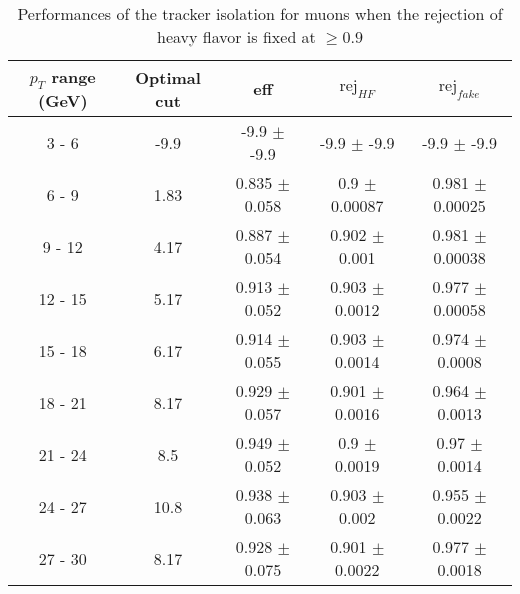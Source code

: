 \begin{table}[htbp]
   \centering
   \begin{tabular}{|c|c|c|c|c|}
      \hline
      $p_T$ range (GeV) & Optimal cut & eff & $\textrm{rej}_{HF}$ & $\textrm{rej}_{fake}$ \\
      \hline
      3 - 6 & -9.9 & -9.9 $\pm$ -9.9 & -9.9 $\pm$ -9.9 & -9.9 $\pm$ -9.9 \\
      \hline
      6 - 9 & 1.83 & 0.835 $\pm$ 0.058 & 0.9 $\pm$ 0.00087 & 0.981 $\pm$ 0.00025 \\
      \hline
      9 - 12 & 4.17 & 0.887 $\pm$ 0.054 & 0.902 $\pm$ 0.001 & 0.981 $\pm$ 0.00038 \\
      \hline
      12 - 15 & 5.17 & 0.913 $\pm$ 0.052 & 0.903 $\pm$ 0.0012 & 0.977 $\pm$ 0.00058 \\
      \hline
      15 - 18 & 6.17 & 0.914 $\pm$ 0.055 & 0.903 $\pm$ 0.0014 & 0.974 $\pm$ 0.0008 \\
      \hline
      18 - 21 & 8.17 & 0.929 $\pm$ 0.057 & 0.901 $\pm$ 0.0016 & 0.964 $\pm$ 0.0013 \\
      \hline
      21 - 24 & 8.5 & 0.949 $\pm$ 0.052 & 0.9 $\pm$ 0.0019 & 0.97 $\pm$ 0.0014 \\
      \hline
      24 - 27 & 10.8 & 0.938 $\pm$ 0.063 & 0.903 $\pm$ 0.002 & 0.955 $\pm$ 0.0022 \\
      \hline
      27 - 30 & 8.17 & 0.928 $\pm$ 0.075 & 0.901 $\pm$ 0.0022 & 0.977 $\pm$ 0.0018 \\
      \hline
   \end{tabular}
   \caption{\small{Performances of the tracker isolation for muons when the rejection of heavy flavor is fixed at $\geq 0.9$}\label{tab:track_muon_pureHf}}
\end{table}






